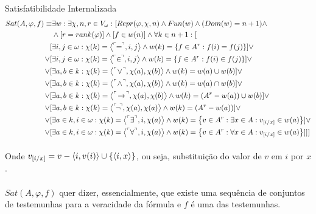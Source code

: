         \begin{definition}{Satisfatibilidade Internalizada}
            \begin{align*}
                Sat(A,\varphi,f)\equiv&\exists w:\exists \chi,n,r\in V_\omega:[Repr(\varphi,\chi,n)\land Fun(w)\land (Dom(w) = n+1)\land\\
                    &\land [r = rank(\varphi)] \land [f\in w(n)]\land\forall k \in n+1:[\\
                            [&\exists i, j\in\omega     : \chi(k) = \TUPLE{\FMLA{\!\!=\!\!}}{  i    }{    j  } \land w(k) = \SET{f \in A^r : f(i)  = f(j)}]\lor\\
                        \lor[&\exists i, j\in\omega     : \chi(k) = \TUPLE{\FMLA{\!\!\in\!\!}}{i    }{    j  } \land w(k) = \SET{f \in A^r : f(i)\in f(j)}]\lor\\
                        \lor[&\exists a, b\in   k       : \chi(k) = \TUPLE{\FMLA{\!\lor\! }}{\chi(a)}{\chi(b)} \land w(k) = w(a)\cup w(b)]\lor\\
                        \lor[&\exists a, b\in   k       : \chi(k) = \TUPLE{\FMLA{\!\land\!}}{\chi(a)}{\chi(b)} \land w(k) = w(a)\cap w(b)]\lor\\
                        \lor[&\exists a, b\in   k       : \chi(k) = \TUPLE{\FMLA{\!\rar\!}}{\chi(a)}{\chi(b) } \land w(k) = (A^r - w(a))\cup w(b)]\lor\\
                        \lor[&\exists a, b\in   k       : \chi(k) = \TUPLE{\FMLA{\!\neg\!}}{\chi(a)}{\chi(a) } \land w(k) = (A^r - w(a))]\lor\\
                        \lor[&\exists a\in k, i\in\omega: \chi(k) = \TUPLE{\FMLA{\exists }}{   i   }{\chi(a) } \land w(k) = \SET{v\in A^r : \exists x\in A: v_{[i\slash x]}\in w(a) }]\lor\\
                        \lor[&\exists a\in k, i\in\omega: \chi(k) = \TUPLE{\FMLA{\forall }}{   i   }{\chi(a) } \land w(k) = \SET{v\in A^r : \forall x\in A: v_{[i\slash x]}\in w(a) }]]]
            \end{align*}
            
            \paragraph{}
                Onde $v_{[i\slash x]} = v - \TUPLE{i}{v(i)} \cup \SET{\TUPLE{i}{x}}$, ou seja, substituição do valor de $v$ em $i$ por $x$.
            \paragraph{}
                $Sat(A,\varphi,f)$ quer dizer, essencialmente, que existe uma sequência de conjuntos de testemunhas para a veracidade 
                da fórmula e $f$ é uma das testemunhas.
        \end{definition}
